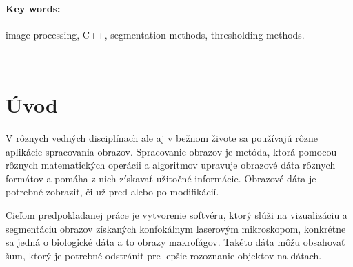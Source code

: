 \documentclass[a4paper,11pt,oneside]{article}%
\begin{document}

\paragraph*{Key words:}image processing, C++, segmentation methods, thresholding methods.

\newpage
\thispagestyle{empty}
\tableofcontents %
\newpage
\
\section{Úvod}
\setcounter{page}{1}




V rôznych vedných disciplínach ale aj v bežnom živote sa používajú rôzne aplikácie spracovania obrazov. Spracovanie obrazov je metóda, ktorá pomocou rôznych matematických operácii a algoritmov upravuje obrazové dáta rôznych formátov a pomáha z nich získavať užitočné informácie. Obrazové dáta je potrebné zobraziť, či už pred alebo po modifikácií. 

Cieľom predpokladanej práce je vytvorenie softvéru, ktorý slúži na vizualizáciu a segmentáciu obrazov získaných konfokálnym laserovým mikroskopom, konkrétne sa jedná o biologické dáta a to obrazy makrofágov. Takéto dáta môžu obsahovať šum, ktorý je potrebné odstrániť pre lepšie rozoznanie objektov na dátach. 
 
\end{document}
